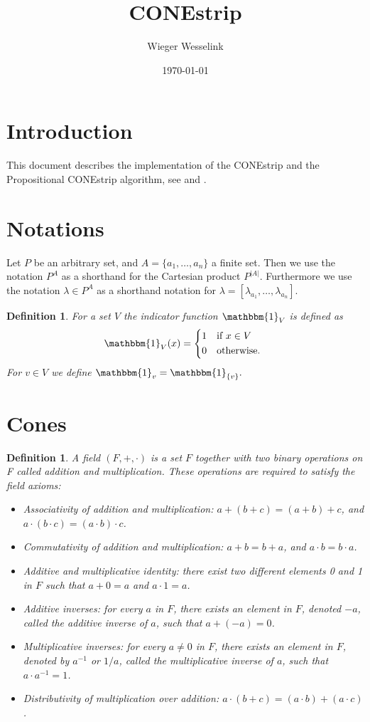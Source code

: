 \documentclass{article}
\title{CONEstrip}
\author{Wieger Wesselink}
\date{\today}
\theoremstyle{mytheorem}
\newtheorem{definition}[theorem]{Definition}
\newcommand{\set}[1]{\ensuremath{\{ #1 \} }} %
\newcommand{\indicator}[1]{\ensuremath{\mathbbm{1}_{#1}}} %
\begin{document}
\maketitle

\section{Introduction}
This document describes the implementation of the CONEstrip and the Propositional CONEstrip algorithm, see \cite{Quaeghebeur2012} and \cite{Quaeghebeur2014}.

\section{Notations}
Let $P$ be an arbitrary set, and $A = \set{a_1, \ldots, a_n}$ a finite set. Then we use the notation
$
  P^A
$
as a shorthand for the Cartesian product $P^{|A|}$.
Furthermore we use the notation
$
  \lambda \in P^A
$
as a shorthand notation for $\lambda = [\lambda_{a_1}, \ldots, \lambda_{a_n}].$

\begin{definition}
For a set $V$ the \emph{indicator function} $\indicator{V}$ is defined as
\[
  \indicator{V}(x) =
  \begin{cases*}
    1 & if $x \in V$ \\
    0 & otherwise.
  \end{cases*}
\]
For $v \in V$ we define $\indicator{v} = \indicator{\set{v}}.$
\end{definition}

\section{Cones}

\begin{definition}
A \emph{field} $(F, +, \cdot)$ is a set $F$ together with two binary operations on F called addition and multiplication. These operations are required to satisfy the field axioms:
  \begin{itemize}
    \item Associativity of addition and multiplication: $a + (b + c) = (a + b) + c$, and $a \cdot (b \cdot c) = (a \cdot b) \cdot c$.
    \item Commutativity of addition and multiplication: $a + b = b + a$, and $a \cdot b = b \cdot a$.
    \item Additive and multiplicative identity: there exist two different elements 0 and 1 in $F$ such that $a + 0 = a$ and $a \cdot 1 = a$.
    \item Additive inverses: for every $a$ in $F$, there exists an element in $F$, denoted $-a$, called the additive inverse of $a$, such that $a + (-a) = 0$.
    \item Multiplicative inverses: for every $a \neq 0$ in $F$, there exists an element in $F$, denoted by $a^{-1}$ or $1/a$, called the multiplicative inverse of $a$, such that $a \cdot a^{-1} = 1$.
    \item Distributivity of multiplication over addition: $a \cdot (b + c) = (a \cdot b) + (a \cdot c)$.
  \end{itemize}
\end{definition}
\end{document}
